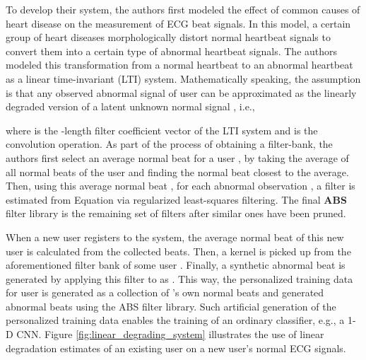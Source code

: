 \documentclass[journal,transmag]{IEEEtran}
\begin{document}
To develop their system, the authors first modeled the effect of common causes of heart disease on the measurement of ECG beat signals. In this model, a certain group of heart diseases morphologically distort normal heartbeat signals to convert them into a certain type of abnormal heartbeat signals. The authors modeled this transformation from a normal heartbeat to an abnormal heartbeat as a linear time-invariant (LTI) system. Mathematically speaking, the assumption is that any observed abnormal signal  of user  can be approximated as the linearly degraded version of a latent unknown normal signal , i.e.,

where  is the -length filter coefficient vector of the LTI system and  is the convolution operation. As part of the process of obtaining a filter-bank, the authors first select an average normal beat for a user , by taking the average of all normal beats of the user and finding the normal beat closest to the average. Then, using this average normal beat , for each abnormal observation , a filter  is estimated from Equation  via regularized least-squares filtering. The final \textbf{ABS} filter library is the remaining set of filters after similar ones have been pruned.

When a new user  registers to the system, the average normal beat  of this new user is calculated from the collected beats. Then, a kernel is picked up from the aforementioned filter bank of some user . Finally, a synthetic abnormal beat  is generated by applying this filter to  as . This way, the personalized training data for user  is generated as a collection of 's own normal beats and generated abnormal beats using the ABS filter library. 
Such artificial generation of the  personalized training data enables the training of an ordinary classifier, e.g., a 1-D CNN. Figure \ref{fig:linear_degrading_system} illustrates the use of linear degradation estimates of an existing user on a new user's normal ECG signals.
\end{document}
